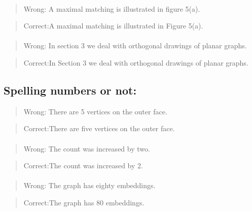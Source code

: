 \documentclass[]{report}
\begin{document}
\paragraph{}
\begin{verse}
{\large Wrong:} A maximal matching is illustrated in figure 5(a).
\end{verse}
\begin{verse}
{\large Correct:}A maximal matching is illustrated in Figure 5(a).
\end{verse}

\paragraph{}
\begin{verse}
{\large Wrong:} In section 3 we deal with orthogonal drawings of
planar graphs.
\end{verse}
\begin{verse}
{\large Correct:}In Section 3 we deal with orthogonal drawings of
planar graphs.
\end{verse}

\subsection{Spelling numbers or not: }
\begin{verse}
{\large Wrong:} There are 5 vertices on the outer face.
\end{verse}
\begin{verse}
{\large Correct:}There are five vertices on the outer face.
\end{verse}
\paragraph{}
\begin{verse}
{\large Wrong:} The count was increased by two.
\end{verse}
\begin{verse}
{\large Correct:}The count was increased by 2.
\end{verse}
\paragraph{}
\begin{verse}
{\large Wrong:} The graph has eighty embeddings.
\end{verse}
\begin{verse}
{\large Correct:}The graph has 80 embeddings.
\end{verse}
\end{document}
